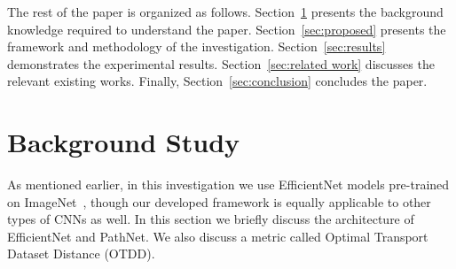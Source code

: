 \documentclass[a4paper,fleqn]{cas-sc}
\begin{document}


The rest of the paper is organized as follows. Section~\ref{sec:background study} presents the background knowledge required to understand the paper.   Section~\ref{sec:proposed} presents the framework and methodology of the investigation. Section~\ref{sec:results} demonstrates the experimental results. Section~\ref{sec:related work} discusses the relevant existing works. Finally, Section~\ref{sec:conclusion} concludes the paper.

\section{Background Study}
\label{sec:background study}

As mentioned earlier, in this investigation we use EfficientNet \cite{TanLe2019} models pre-trained on ImageNet~\cite{Deng2009}, though our developed framework is equally applicable to other types of CNNs as well. In this section we briefly discuss the architecture of EfficientNet and PathNet. We also discuss a metric called Optimal Transport Dataset Distance (OTDD). %

\end{document}
